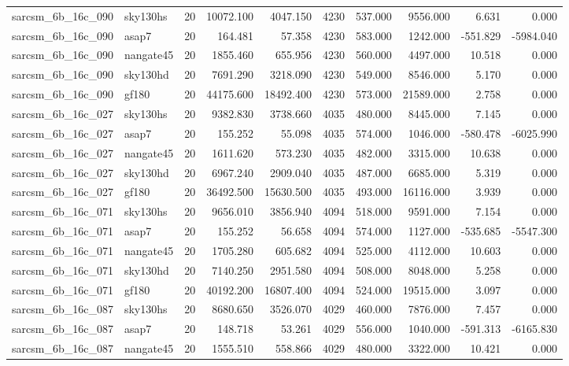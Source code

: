 \begin{tabular}{llrrrrrrrr}
sarcsm\_6b\_16c\_090 & sky130hs & 20 & 10072.100 & 4047.150 & 4230 & 537.000 & 9556.000 & 6.631 & 0.000 \\
sarcsm\_6b\_16c\_090 & asap7 & 20 & 164.481 & 57.358 & 4230 & 583.000 & 1242.000 & -551.829 & -5984.040 \\
sarcsm\_6b\_16c\_090 & nangate45 & 20 & 1855.460 & 655.956 & 4230 & 560.000 & 4497.000 & 10.518 & 0.000 \\
sarcsm\_6b\_16c\_090 & sky130hd & 20 & 7691.290 & 3218.090 & 4230 & 549.000 & 8546.000 & 5.170 & 0.000 \\
sarcsm\_6b\_16c\_090 & gf180 & 20 & 44175.600 & 18492.400 & 4230 & 573.000 & 21589.000 & 2.758 & 0.000 \\
sarcsm\_6b\_16c\_027 & sky130hs & 20 & 9382.830 & 3738.660 & 4035 & 480.000 & 8445.000 & 7.145 & 0.000 \\
sarcsm\_6b\_16c\_027 & asap7 & 20 & 155.252 & 55.098 & 4035 & 574.000 & 1046.000 & -580.478 & -6025.990 \\
sarcsm\_6b\_16c\_027 & nangate45 & 20 & 1611.620 & 573.230 & 4035 & 482.000 & 3315.000 & 10.638 & 0.000 \\
sarcsm\_6b\_16c\_027 & sky130hd & 20 & 6967.240 & 2909.040 & 4035 & 487.000 & 6685.000 & 5.319 & 0.000 \\
sarcsm\_6b\_16c\_027 & gf180 & 20 & 36492.500 & 15630.500 & 4035 & 493.000 & 16116.000 & 3.939 & 0.000 \\
sarcsm\_6b\_16c\_071 & sky130hs & 20 & 9656.010 & 3856.940 & 4094 & 518.000 & 9591.000 & 7.154 & 0.000 \\
sarcsm\_6b\_16c\_071 & asap7 & 20 & 155.252 & 56.658 & 4094 & 574.000 & 1127.000 & -535.685 & -5547.300 \\
sarcsm\_6b\_16c\_071 & nangate45 & 20 & 1705.280 & 605.682 & 4094 & 525.000 & 4112.000 & 10.603 & 0.000 \\
sarcsm\_6b\_16c\_071 & sky130hd & 20 & 7140.250 & 2951.580 & 4094 & 508.000 & 8048.000 & 5.258 & 0.000 \\
sarcsm\_6b\_16c\_071 & gf180 & 20 & 40192.200 & 16807.400 & 4094 & 524.000 & 19515.000 & 3.097 & 0.000 \\
sarcsm\_6b\_16c\_087 & sky130hs & 20 & 8680.650 & 3526.070 & 4029 & 460.000 & 7876.000 & 7.457 & 0.000 \\
sarcsm\_6b\_16c\_087 & asap7 & 20 & 148.718 & 53.261 & 4029 & 556.000 & 1040.000 & -591.313 & -6165.830 \\
sarcsm\_6b\_16c\_087 & nangate45 & 20 & 1555.510 & 558.866 & 4029 & 480.000 & 3322.000 & 10.421 & 0.000 \\

\end{tabular}
